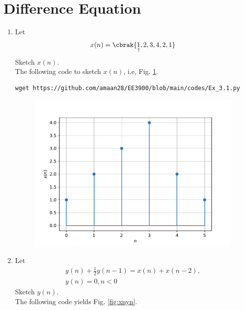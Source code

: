 \documentclass[journal,12pt,twocolumn]{IEEEtran}
\renewcommand\thesection{\arabic{section}}
\begin{document}
\section{Difference Equation}
\begin{enumerate}[label=\thesection.\arabic*,ref=\thesection.\theenumi]
\item Let
\label{def:xn}
\begin{equation}
\label{eq:3.1}
x(n) = \cbrak{\underset{\uparrow}{1},2,3,4,2,1}
\end{equation}
Sketch $x(n)$.
\\
\newline\solution The following code to sketch $x(n)$, i.e, Fig. \ref{fig:3.1}.
\begin{lstlisting}
wget https://github.com/amaan28/EE3900/blob/main/codes/Ex_3.1.py
\end{lstlisting}
\begin{figure}[!ht]
\begin{center}
\includegraphics[width=\columnwidth]{./figs/Ex_3.1.pdf}
\end{center}
\label{fig:3.1}	
\end{figure}
\item Let
\begin{multline}
\label{eq:iir_filter}
y(n) + \frac{1}{2}y(n-1) = x(n) + x(n-2), 
\\
 y(n) = 0, n < 0
\end{multline}
Sketch $y(n)$.
\\
\newline\solution The following code yields Fig. \ref{fig:xnyn}.
\begin{lstlisting}

\end{lstlisting}
\end{enumerate}
\end{document}

